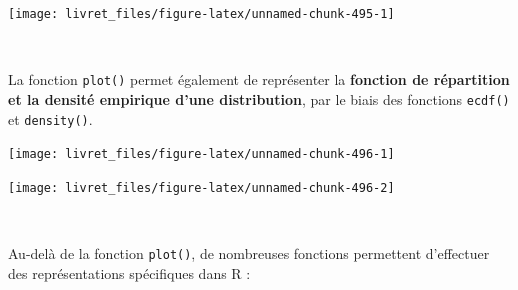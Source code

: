 \documentclass[12pt,twosided, notitlepage]{book}
\newenvironment{Shaded}{}{}
\newcommand{\KeywordTok}[1]{\textcolor[rgb]{0.00,0.00,1.00}{{#1}}}
\newcommand{\DataTypeTok}[1]{{#1}}
\newcommand{\StringTok}[1]{\textcolor[rgb]{0.00,0.50,0.50}{{#1}}}
\newcommand{\CommentTok}[1]{\textcolor[rgb]{0.00,0.50,0.00}{{#1}}}
\newcommand{\OtherTok}[1]{\textcolor[rgb]{1.00,0.25,0.00}{{#1}}}
\newcommand{\NormalTok}[1]{{#1}}
\renewenvironment{Shaded}{\begin{snugshade}}{\end{snugshade}}
\begin{document}
\begin{center}\texttt{[image: livret\_files/figure-latex/unnamed-chunk-495-1]} \end{center}

~

La fonction \texttt{plot()} permet également de
représenter la \textbf{fonction de répartition et la densité empirique
d'une distribution}, par le biais des fonctions
\texttt{ecdf()} et
\texttt{density()}.

\begin{Shaded}
\end{Shaded}

\begin{center}\texttt{[image: livret\_files/figure-latex/unnamed-chunk-496-1]} \end{center}

\begin{Shaded}
\end{Shaded}

\begin{center}\texttt{[image: livret\_files/figure-latex/unnamed-chunk-496-2]} \end{center}

~

Au-delà de la fonction \texttt{plot()}, de nombreuses fonctions
permettent d'effectuer des représentations spécifiques dans R :
\end{document}
